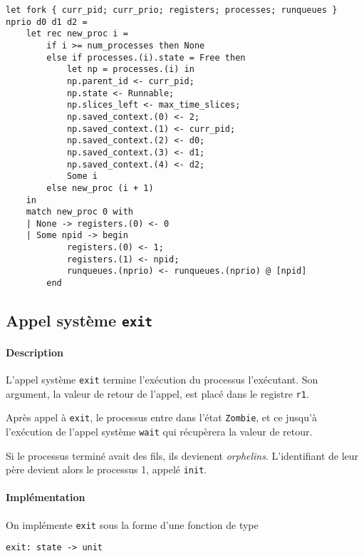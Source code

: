 \documentclass[french, toc]{../cs-classes/cs-classes}
\begin{document}
\begin{verbatim}
let fork { curr_pid; curr_prio; registers; processes; runqueues } nprio d0 d1 d2 =
    let rec new_proc i =
        if i >= num_processes then None
        else if processes.(i).state = Free then
            let np = processes.(i) in
            np.parent_id <- curr_pid;
            np.state <- Runnable;
            np.slices_left <- max_time_slices;
            np.saved_context.(0) <- 2;
            np.saved_context.(1) <- curr_pid;
            np.saved_context.(2) <- d0;
            np.saved_context.(3) <- d1;
            np.saved_context.(4) <- d2;
            Some i
        else new_proc (i + 1)
    in
    match new_proc 0 with
    | None -> registers.(0) <- 0
    | Some npid -> begin
            registers.(0) <- 1;
            registers.(1) <- npid;
            runqueues.(nprio) <- runqueues.(nprio) @ [npid]
        end
\end{verbatim}

\subsection{Appel système \texttt{exit}}
\paragraph*{Description} 
L'appel système \texttt{exit} termine l'exécution du processus l'exécutant. Son argument, la valeur de retour de l'appel, est placé dans le registre \texttt{r1}.

Après appel à \texttt{exit}, le processus entre dans l'état \texttt{Zombie}, et ce jusqu'à l'exécution de l'appel système \texttt{wait} qui récupèrera la valeur de retour.

Si le processus terminé avait des fils, ils devienent \emph{orphelins}. L'identifiant de leur père devient alors le processus 1, appelé \texttt{init}.

\paragraph*{Implémentation} On implémente \texttt{exit} sous la forme d'une fonction de type
\begin{center}
    \texttt{exit: state -> unit}
\end{center}
\end{document}
